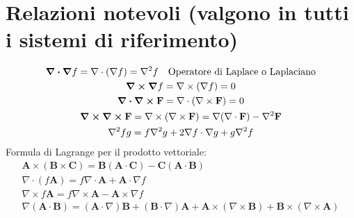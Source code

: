 \documentclass[a4paper]{article}
\begin{document}
\section {Relazioni notevoli (valgono in tutti i sistemi di riferimento)}
\begin{gather}
\div  \grad f = \nabla \cdot (\nabla f) = \nabla^2 f \quad\text{Operatore di Laplace o Laplaciano}\\
\curl \grad f = \nabla \times (\nabla f) = 0\\
\div  \curl \mathbf{F} = \nabla \cdot (\nabla \times \mathbf{F}) = 0\\
\curl \curl \mathbf{F} = \nabla \times (\nabla \times \mathbf{F}) = \nabla (\nabla \cdot \mathbf{F}) - \nabla^2 \mathbf{F}\\
\nabla^2 f g = f \nabla^2 g + 2 \nabla f \cdot \nabla g + g \nabla^2 f
\end{gather}
Formula di Lagrange per il prodotto vettoriale: 
\begin{gather}
\mathbf{A} \times (\mathbf{B} \times \mathbf{C}) = \mathbf{B} (\mathbf{A} \cdot \mathbf{C}) - \mathbf{C} (\mathbf{A} \cdot \mathbf{B})\\
\nabla\cdot(f \mathbf A)=f \nabla\cdot\mathbf A+\mathbf A\cdot\nabla f\\
\nabla\times f \mathbf A= f \nabla\times \mathbf A-\mathbf A\times \nabla f\\
\nabla ( \mathbf{A} \cdot \mathbf{B} ) 
  = ( \mathbf{A} \cdot \nabla ) \mathbf{B}
  + ( \mathbf{B} \cdot \nabla ) \mathbf{A}
  + \mathbf{A} \times ( \nabla \times \mathbf{B} )
  + \mathbf{B} \times ( \nabla \times \mathbf{A} )
\end{gather}
\end{document}
